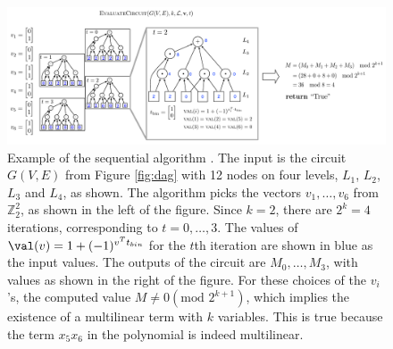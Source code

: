 \begin{figure}[!htbp]
\includegraphics[width=\textwidth]{img/algorithm-example-v2_fixed.pdf}
\caption{
\small
Example of the sequential algorithm \maxwt{}. The input is the circuit $G(V,E)$ from
Figure \ref{fig:dag} with 12 nodes on four levels, $L_1$, $L_2$, $L_3$ and $L_4$, as shown.
The algorithm picks the vectors $v_1,\ldots,v_6$ from $\mathbb{Z}_2^2$, as shown in
the left of the figure. Since $k=2$, there are $2^k=4$ iterations, corresponding to
$t=0,\ldots,3$. The values of $\val(v)=1+(-1)^{v^Tt_{bin}}$ for the $t$th iteration
are shown in blue as the input values. The outputs of the circuit are $M_0, \ldots, M_3$,
with values as shown in the right of the figure. For these choices of the $v_i$'s, the
computed value $M\neq 0 (\text{mod } 2^{k+1})$, which implies the existence of a
multilinear term with $k$ variables. This is true because the term $x_5x_6$ in the
polynomial is indeed multilinear.
}
\label{fig:algorithm-example}
\end{figure}

